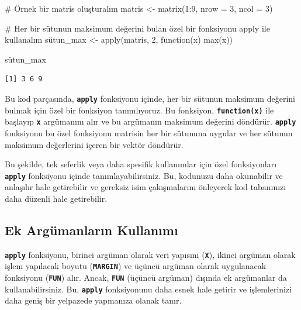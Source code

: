 \documentclass[
  letterpaper,
  DIV=11,
  numbers=noendperiod]{scrreprt}
\newenvironment{Shaded}{\begin{snugshade}}{\end{snugshade}}
\newcommand{\AttributeTok}[1]{\textcolor[rgb]{0.40,0.45,0.13}{#1}}
\newcommand{\CommentTok}[1]{\textcolor[rgb]{0.37,0.37,0.37}{#1}}
\newcommand{\ControlFlowTok}[1]{\textcolor[rgb]{0.00,0.23,0.31}{#1}}
\newcommand{\DecValTok}[1]{\textcolor[rgb]{0.68,0.00,0.00}{#1}}
\newcommand{\FunctionTok}[1]{\textcolor[rgb]{0.28,0.35,0.67}{#1}}
\newcommand{\NormalTok}[1]{\textcolor[rgb]{0.00,0.23,0.31}{#1}}
\newcommand{\OtherTok}[1]{\textcolor[rgb]{0.00,0.23,0.31}{#1}}
\newcommand{\SpecialCharTok}[1]{\textcolor[rgb]{0.37,0.37,0.37}{#1}}
\begin{document}
\begin{Shaded}
\begin{Highlighting}[]
\CommentTok{\# Örnek bir matris oluşturalım}
\NormalTok{matris }\OtherTok{\textless{}{-}} \FunctionTok{matrix}\NormalTok{(}\DecValTok{1}\SpecialCharTok{:}\DecValTok{9}\NormalTok{, }\AttributeTok{nrow =} \DecValTok{3}\NormalTok{, }\AttributeTok{ncol =} \DecValTok{3}\NormalTok{)}

\CommentTok{\# Her bir sütunun maksimum değerini bulan özel bir fonksiyonu apply ile kullanalım}
\NormalTok{sütun\_max }\OtherTok{\textless{}{-}} \FunctionTok{apply}\NormalTok{(matris, }\DecValTok{2}\NormalTok{, }\ControlFlowTok{function}\NormalTok{(x) }\FunctionTok{max}\NormalTok{(x))}

\NormalTok{sütun\_max}
\end{Highlighting}
\end{Shaded}

\begin{verbatim}
[1] 3 6 9
\end{verbatim}

Bu kod parçasında, \textbf{\texttt{apply}} fonksiyonu içinde, her bir
sütunun maksimum değerini bulmak için özel bir fonksiyon tanımlıyoruz.
Bu fonksiyon, \textbf{\texttt{function(x)}} ile başlayıp
\textbf{\texttt{x}} argümanını alır ve bu argümanın maksimum değerini
döndürür. \textbf{\texttt{apply}} fonksiyonu bu özel fonksiyonu matrisin
her bir sütununa uygular ve her sütunun maksimum değerlerini içeren bir
vektör döndürür.

Bu şekilde, tek seferlik veya daha spesifik kullanımlar için özel
fonksiyonları \textbf{\texttt{apply}} fonksiyonu içinde
tanımlayabilirsiniz. Bu, kodunuzu daha okunabilir ve anlaşılır hale
getirebilir ve gereksiz isim çakışmalarını önleyerek kod tabanınızı daha
düzenli hale getirebilir.

\subsection{Ek Argümanların
Kullanımı}\label{ek-arguxfcmanlarux131n-kullanux131mux131}

\textbf{\texttt{apply}} fonksiyonu, birinci argüman olarak veri yapısını
(\textbf{\texttt{X}}), ikinci argüman olarak işlem yapılacak boyutu
(\textbf{\texttt{MARGIN}}) ve üçüncü argüman olarak uygulanacak
fonksiyonu (\textbf{\texttt{FUN}}) alır. Ancak, \textbf{\texttt{FUN}}
(üçüncü argüman) dışında ek argümanlar da kullanabilirsiniz. Bu,
\textbf{\texttt{apply}} fonksiyonunu daha esnek hale getirir ve
işlemlerinizi daha geniş bir yelpazede yapmanıza olanak tanır.
\end{document}
